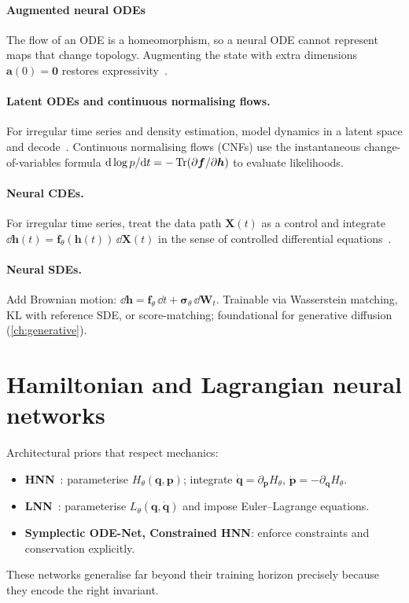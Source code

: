 \paragraph{Augmented neural ODEs}
The flow of an ODE is a homeomorphism, so a neural ODE cannot represent
maps that change topology. Augmenting the state with extra dimensions
$\bm{a}(0)=\bm{0}$ restores expressivity~\cite{dupont2019anode}.

\paragraph{Latent ODEs and continuous normalising flows.}
For irregular time series and density estimation, model dynamics in a
latent space and decode~\cite{rubanova2019latentode}. Continuous
normalising flows (CNFs) use the instantaneous change-of-variables
formula
$\mathrm{d}\log p/\mathrm{d} t=-\operatorname{Tr}(\partial \bm{f}/\partial \bm{h})$ to evaluate
likelihoods.

\paragraph{Neural CDEs.}
For irregular time series, treat the data path $\bm{X}(t)$ as a
control and integrate
$\dd\bm{h}(t)=\bm{f}_\theta(\bm{h}(t))\,\dd\bm{X}(t)$ in the sense of
controlled differential equations~\cite{kidger2020ncde}.

\paragraph{Neural SDEs.}
Add Brownian motion: $\dd\bm{h}=\bm{f}_\theta\,\dd t+\bm{\sigma}_\theta\,\dd\bm{W}_t$.
Trainable via Wasserstein matching, KL with reference SDE, or score-matching;
foundational for generative diffusion (\cref{ch:generative}).

\section{Hamiltonian and Lagrangian neural networks}
Architectural priors that respect mechanics:
\begin{itemize}
\item \textbf{HNN}~\cite{greydanus2019hnn}: parameterise $H_\theta(\bm{q},\bm{p})$;
integrate $\dot{\bm{q}}=\partial_{\bm{p}}H_\theta$,
$\dot{\bm{p}}=-\partial_{\bm{q}}H_\theta$.
\item \textbf{LNN}~\cite{cranmer2020lnn}: parameterise $L_\theta(\bm{q},\dot{\bm{q}})$
and impose Euler--Lagrange equations.
\item \textbf{Symplectic ODE-Net, Constrained HNN}: enforce constraints
and conservation explicitly.
\end{itemize}
These networks generalise far beyond their training horizon precisely
because they encode the right invariant.

